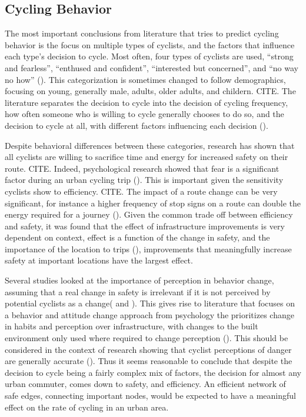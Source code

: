 
\subsection{Cycling Behavior}

The most important conclusions from literature that tries to predict cycling behavior is the focus on multiple types of cyclists, and the factors that influence each type's decision to cycle. Most often, four types of cyclists are used, ``strong and fearless'', ``enthused and confident'', ``interested but concerned'', and ``no way no how'' (\cite{dill2013four}). This categorization is sometimes changed to follow demographics, focusing on young, generally male, adults, older adults, and childern. CITE. The literature separates the decision to cycle into the decision of cycling frequency, how often someone who is willing to cycle generally chooses to do so, and the decision to cycle at all, with different factors influencing each decision (\cite{stinson2005comparison}). 

Despite behavioral differences between these categories, research has shown that all cyclists are willing to sacrifice time and energy for increased safety on their route. CITE. Indeed, psychological research showed that fear is a significant factor during an urban cycling trip (\cite{ellett2018state}). This is important given the sensitivity cyclists show to efficiency. CITE. The impact of a route change can be very significant, for instance a higher frequency of stop signs on a route can double the energy required for a journey (\cite{fajans2001bicyclists}). Given the common trade off between efficiency and safety, it was found that the effect of infrastructure improvements is very dependent on context, effect is a function of the change in safety, and the importance of the location to trips (\cite{kondo2018bike}), improvements that meaningfully increase safety at important locations have the largest effect. 

Several studies looked at the importance of perception in behavior change, assuming that a real change in safety is irrelevant if it is not perceived by potential cyclists as a change(\cite{li2012physical} and \cite{parkin2007models}). This gives rise to literature that focuses on a behavior and attitude change approach from psychology the prioritizes change in habits and perception over infrastructure, with changes to the built environment only used where required to change perception (\cite{savan2017integrated}). This should be considered in the context of research showing that cyclist perceptions of danger are generally accurate (\cite{vandenbulcke2014predicting}). Thus it seems reasonable to conclude that despite the decision to cycle being a fairly complex mix of factors, the decision for almost any urban commuter, comes down to safety, and efficiency. An efficient network of safe edges, connecting important nodes, would be expected to have a meaningful effect on the rate of cycling in an urban area.  


